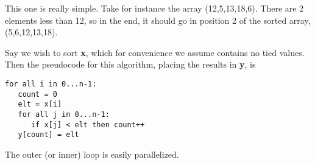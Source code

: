 This one is really simple.  Take for instance the array (12,5,13,18,6).
There are 2 elements less than 12, so in the end, it should go in
position 2 of the sorted array, (5,6,12,13,18).

Say we wish to sort {\bf x}, which for convenience we assume contains no
tied values.  Then the pseudocode for this algorithm, placing the
results in {\bf y}, is

\begin{Verbatim}[fontsize=\relsize{-2}]
for all i in 0...n-1:
   count = 0
   elt = x[i]
   for all j in 0...n-1:
      if x[j] < elt then count++
   y[count] = elt
\end{Verbatim}

The outer (or inner) loop is easily parallelized.
